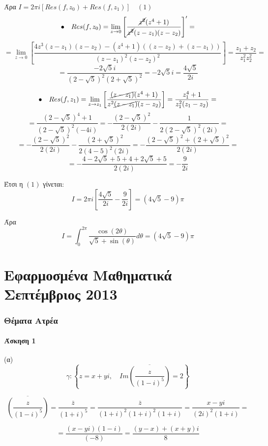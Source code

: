 \documentclass[12pt]{article}
\begin{document}
Άρα $I=2\pi i \left[ Res(f,z_0)+ Res(f,z_1) \right] \quad (1)$
\\
$$ \bullet\quad Res(f,z_0)=\lim_{z \to 0}\left[\frac{\cancel{z^2}(z^4+1)}{\cancel{z^2}(z-z_1)(z-z_2)}\right]'=$$
$$ =\lim_{z \to 0}\left[\frac{ 4z^3(z-z_1)(z-z_2)-(z^4+1)((z-z_2)+(z-z_1))}{ (z-z_1)^2(z-z_2)^2}\right]=\frac{ z_1+z_2}{ z_1^2 z_2^2}=$$
$$ =\frac{-2\sqrt{5}i}{(2-\sqrt{5})^2(2+\sqrt{5})^2}= -2\sqrt{5}i = \frac{4\sqrt{5}}{2i} $$



$$ \bullet\quad Res(f,z_1)=\lim_{z \to z_1}\left[\frac{\cancel{(z-z_1)}(z^4+1)}{z^2\cancel{(z-z_1)}(z-z_2)}\right]=\frac{z_1^4+1}{z_1^2(z_1-z_2)}=$$
$$= \frac{(2-\sqrt{5})^4+1}{(2-\sqrt{5})^2(-4i)}=-\frac{(2-\sqrt{5})^2}{2(2i)}-\frac{1}{2(2-\sqrt{5})^2(2i)}=$$
$$=-\frac{(2-\sqrt{5})^2}{2(2i)}-\frac{(2+\sqrt{5})^2}{2(4-5)^2(2i)}=-\frac{(2-\sqrt{5})^2+(2+\sqrt{5})^2}{2(2i)}=$$
$$ =-\frac{4-2\sqrt{5}+5+4+2\sqrt{5}+5}{2(2i)}=-\frac{9}{2i} $$

Έτσι η $(1)$ γίνεται:
$$ I=2\pi i \left[ \frac{4\sqrt{5}}{2i} -\frac{9}{2i} \right]= (4\sqrt{5}-9)\pi $$

Άρα 
$$I=\int_{0}^{2\pi} \frac{\cos{(2 \theta)}}{\sqrt{5}+\sin{(\theta)}} d \theta=  (4\sqrt{5}-9)\pi $$
 

\newpage \part{Εφαρμοσμένα Μαθηματικά Σεπτέμβριος 2013}
\author{}


  

\maketitle
\newpage
 

 \section{Θέματα Ατρέα}
 \subsection{Άσκηση 1}

(α) 
$$ \gamma : \left\{ z=x+yi, \quad Im \overline{\left( \frac{z}{(1-i)^5} \right)}=2  \right\} $$

$$ \overline{ \left( \frac{z}{(1-i)^5} \right)}= \frac{\overline{z} }{(1+i)^5 }= \frac{\overline{z} }{(1+i)^2(1+i)^2(1+i) }= \frac{x-yi }{(2i)^2(1+i) }= $$

$$ = \frac{ (x-yi)(1-i) }{(-8) }=\frac{ (y-x)+(x+y)i }{8} $$
\end{document}
